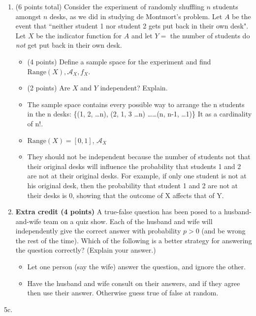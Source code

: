 \documentclass[11pt]{article}
\newcommand{\Range}{{\mathrm{Range}}}
\newcommand{\A}{{\mathcal{A}}}
\begin{document}
\begin{enumerate}
\item (6 points total) Consider the experiment of randomly shuffling
$n$ students amongst $n$ desks, as we did in studying de Montmort's problem.
Let $A$ be the event that ``neither student 1 nor student 2 gets
put back in their own desk".
Let $X$ be the indicator function for $A$ and let $Y = $ the number of
students do \emph{not} get put back in their own desk.

\begin{itemize}
\item (4 points) Define a sample space for the experiment and find 
$\Range(X), \A_X, f_X$.
\item (2 points) Are $X$ and $Y$ independent?  Explain.
\end{itemize}

\begin{itemize}
\item The sample space contains every possible way to arrange the n students in 
the n desks: \{(1, 2, \dots n), (2, 1, 3 \dots n) \dots\dots (n, n-1, \dots 1)\}
It as a cardinality of n!.
\item $\Range(X) = [0, 1]$, $\A_X$ 
\item They should not be independent because the number of students not that 
their original desks will influence the probability that students 1 and 2 are 
not at their original desks. For example, if only one student is not at his 
original desk, then the probability that student 1 and 2 are not at their desks 
is 0, showing that the outcome of X affects that of Y.
\end{itemize}

\item \textbf{Extra credit (4 points)} A true-false question has been
posed to a husband-and-wife team on a quiz show.  Each of the husband
and wife will independently give the correct answer with probability $p>0$
(and be wrong the rest of the time).
Which of the following is a better strategy for answering the question 
correctly?  (Explain your answer.)
\begin{itemize}
\item Let one person (say the wife) answer the question, and ignore the other.
\item Have the husband and wife consult on their answers, and if they agree
then use their answer.  Otherwise guess true of false at random.
\end{itemize}
\end{enumerate}

\clearpage
5c. 
\end{document}
